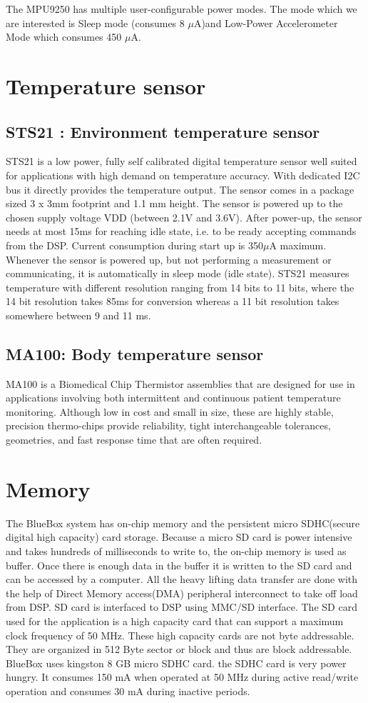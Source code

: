 The MPU9250 has multiple user-configurable power modes. The mode which we are interested is Sleep mode (consumes 8 $\mu$A)and Low-Power Accelerometer Mode which consumes 450 $\mu$A. 
 
\section{Temperature sensor}
\subsection{ STS21 : Environment temperature sensor}
STS21 is a low power, fully self calibrated digital temperature sensor well suited for applications with high demand on temperature accuracy. With dedicated I2C bus it directly provides the temperature output. The sensor comes in a package sized 3 x 3mm footprint and 1.1 mm height. The sensor is powered up to the chosen supply voltage VDD (between 2.1V and 3.6V). After power-up, the sensor needs at most 15ms for reaching idle state, i.e. to be ready accepting commands from the DSP. Current consumption during start up is 350$\mu$A maximum. Whenever the sensor is powered up, but not performing a measurement or communicating, it is automatically in sleep mode (idle state). STS21 measures temperature with different resolution ranging from 14 bits to 11 bits, where the 14 bit resolution takes 85ms for conversion whereas a 11 bit resolution takes somewhere between 9 and 11 ms.

\subsection{MA100: Body temperature sensor} 
MA100 is a Biomedical Chip Thermistor assemblies that are designed for use in applications involving both intermittent and continuous patient temperature monitoring. Although low in cost and small in size, these are highly stable, precision thermo-chips provide reliability, tight interchangeable tolerances, geometries, and fast response time that are often required.
 
\section{Memory}\label{memory}
The BlueBox system has on-chip memory and the persistent micro SDHC(secure digital high capacity) card storage. Because a micro SD card is power intensive and takes hundreds of milliseconds to write to, the on-chip memory is used as buffer. Once there is enough data in the buffer it is written to the SD card and can be accessed by a computer. All the heavy lifting data transfer are done with the help of Direct Memory access(DMA) peripheral interconnect to take off load from DSP. SD card is interfaced to DSP using MMC/SD interface. The SD card used for the application is a high capacity card that can support a maximum clock frequency of 50 MHz. These high capacity cards are not byte addressable. They are organized in 512 Byte sector or block and thus are block addressable. BlueBox uses kingston 8 GB micro SDHC card. the SDHC card is very power hungry. It consumes 150 mA when operated at 50 MHz during active read/write operation and consumes 30 mA during inactive periods.

